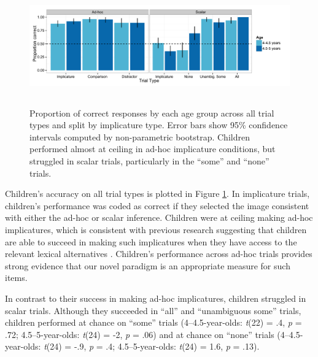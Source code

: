 \documentclass[man]{apa2}
\begin{document}
\begin{figure} 
 \begin{center} 
  \includegraphics[height=2in]{figures/exp1_performance.pdf} 
  \caption{\label{fig:exp1_perf} Proportion of correct responses by each age group across all trial types and split by implicature type. Error bars show 95\% confidence intervals computed by non-parametric bootstrap. Children performed almost at ceiling in ad-hoc implicature conditions, but struggled in scalar trials, particularly in the ``some'' and ``none'' trials.} 
 \end{center} 
\end{figure}

Children's accuracy on all trial types is plotted in Figure \ref{fig:exp1_perf}. In implicature trials, children's performance was coded as correct if they selected the image consistent with either the ad-hoc or scalar inference. Children were at ceiling making ad-hoc implicatures, which is consistent with previous research suggesting that children are able to succeed in making such implicatures when they have access to the relevant lexical alternatives \cite{stiller2014}. Children's performance across ad-hoc trials provides strong evidence that our novel paradigm is an appropriate measure for such items.

In contrast to their success in making ad-hoc implicatures, children struggled in scalar trials. Although they succeeded in ``all'' and ``unambiguous some'' trials, children performed at chance on ``some'' trials (4--4.5-year-olds: \emph{t}(22) = .4, \emph{p} = .72; 4.5--5-year-olds: \emph{t}(24) = -2, \emph{p} =  .06) and at chance on ``none'' trials (4--4.5-year-olds: \emph{t}(24) = -.9, \emph{p} = .4; 4.5--5-year-olds: \emph{t}(24) = 1.6, \emph{p} = .13). 
	
\end{document}
